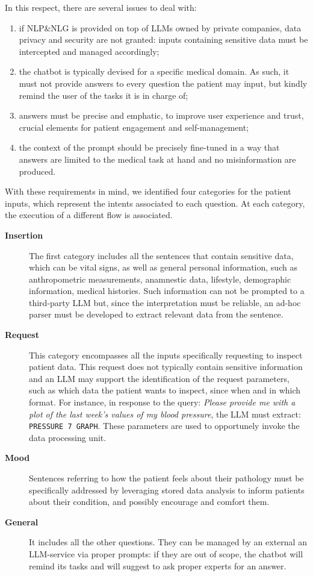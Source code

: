 \documentclass[preprint,12pt]{elsarticle}
\begin{document}
In this respect, there are several issues to deal with:
\begin{enumerate}
    \item if NLP\&NLG is provided on top of LLMs owned by private companies, data privacy and security are not granted: inputs containing sensitive data must be intercepted and managed accordingly;
    \item the chatbot is typically devised for a specific medical domain. As such, it must not provide answers to every question the patient may input, but kindly remind the user of the tasks it is in charge of;
    \item answers must be precise and emphatic, to improve user experience and trust, crucial elements for patient engagement and self-management;
    \item the context of the prompt should be precisely fine-tuned in a way that answers are limited to the medical task at hand and no misinformation are produced.
\end{enumerate}
%
\noindent With these requirements in mind, we identified four categories for the patient inputs, which represent the intents associated to each question. At each category, the execution of a different flow is associated.
%
\begin{description}  
    \item[\textbf{Insertion}] The first category includes all the sentences that contain sensitive data, which can be vital signs, as well as general personal information, such as anthropometric measurements, anamnestic data, lifestyle, demographic information, medical histories. 
    Such information can not be prompted to a third-party LLM but, since the interpretation must be reliable, an ad-hoc parser must be developed to extract relevant data from the sentence.
    \item[\textbf{Request}] This category encompasses all the inputs specifically requesting to inspect patient data. 
    This request does not typically contain sensitive information and an LLM may support the identification of the request parameters, 
    such as which data the patient wants to inspect, since when and in which format. For instance, in response to the query: \emph{Please provide me with a plot of the last week's values of my blood pressure}, the LLM must extract: \texttt{PRESSURE 7 GRAPH}. These parameters are used to opportunely invoke the data processing unit.
    \item[\textbf{Mood}] Sentences referring to how the patient feels about their pathology must be specifically addressed by leveraging stored data analysis to inform patients about their condition, and possibly encourage and comfort them.
    \item[\textbf{General}] It includes all the other questions. They can be managed by an external an LLM-service via proper prompts: if they are out of scope, the chatbot will remind its tasks and will suggest to ask proper experts for an answer. 
\end{description}
\end{document}
